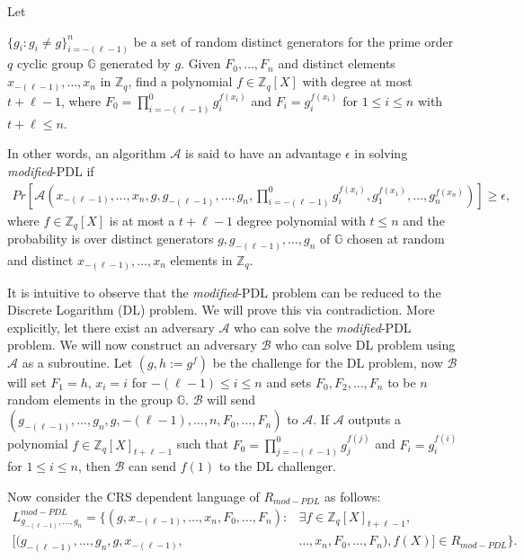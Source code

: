 \begin{definition}
  Let\par 
  $\{g_i : g_i\neq g\}_{i=-(\ell-1)}^n$ be a set of random distinct generators for the prime order $q$ cyclic 
  group $\mathbb{G}$ generated by $g$. Given $F_0,\dots,F_n$ and distinct elements $x_{-(\ell-1)},\dots,x_n$ in 
  $\mathbb{Z}_q$, find a polynomial $f\in\mathbb{Z}_q[X]$ with degree at most $t+\ell-1$, where $F_0=\prod_{i=-(\ell-1)}^{0}g_i^{f(x_i)}$ and
  $F_i=g_i^{f(x_i)}$ for $1\leq i\leq n$ with $t+\ell\leq n$.\par

  In other words, an algorithm $\mathcal{A}$ is said to have an advantage $\epsilon$ in solving \textit{modified}-PDL if 
  \begin{align*}
    Pr[\mathcal{A}(x_{-(\ell-1)},\dots,x_n,g,g_{-(\ell-1)},\dots,g_n,\prod_{i=-(\ell-1)}^{0}g_i^{f(x_i)},g_1^{f(x_1)},\dots,g_n^{f(x_n)})]\geq\epsilon,
  \end{align*}
  where $f\in\mathbb{Z}_q[X]$ is at most a $t+\ell-1$ degree polynomial with $t\leq n$ and the probability is over 
  distinct generators $g,g_{-(\ell-1)},\dots,g_n$ of $\mathbb{G}$ chosen at random and distinct $x_{-(\ell-1)},\dots,x_n$ 
  elements in $\mathbb{Z}_q$.
\end{definition}

It is intuitive to observe that the \textit{modified}-PDL problem can be reduced to the 
Discrete Logarithm (DL) problem. We will prove this via contradiction. More explicitly, 
let there exist an adversary $\mathcal{A}$ 
who can solve the \textit{modified}-PDL problem. We will now construct an adversary $\mathcal{B}$ 
who can solve DL problem using $\mathcal{A}$ as a subroutine. Let $(g,h := g^f)$ be the challenge 
for the DL problem, now $\mathcal{B}$ will set $F_1=h$, $x_i=i$ for $-(\ell-1)\leq i\leq n$ and sets 
$F_0,F_2,\dots,F_n$ to be $n$ random elements in the group $\mathbb{G}$. $\mathcal{B}$ will 
send $(g_{-(\ell-1)},\dots,g_n,g,-(\ell-1),\dots,n,F_0,\dots,F_n)$ to $\mathcal{A}$. If $\mathcal{A}$ 
outputs a polynomial $f\in\mathbb{Z}_q[X]_{t+\ell-1}$ such that $F_0=\prod_{j=-(\ell-1)}^{0}g_j^{f(j)}$ and 
$F_i=g_i^{f(i)}$ for $1\leq i\leq n$, then $\mathcal{B}$ can send $f(1)$ to the DL challenger.\par

Now consider the CRS dependent language of $R_{mod-PDL}$ as follows:
\begin{align*}
  L_{g_{-(\ell-1)},\dots,g_n}^{mod-PDL} = \{(g,x_{-(\ell-1)},\dots,x_n,F_0,\dots,F_n) : &\exists f\in\mathbb{Z}_q[X]_{t+\ell-1},\\ 
  [(g_{-(\ell-1)},\dots,g_n,g,x_{-(\ell-1)},&\dots,x_n,F_0,\dots,F_n),f(X)]\in R_{mod-PDL}\}.
\end{align*}

